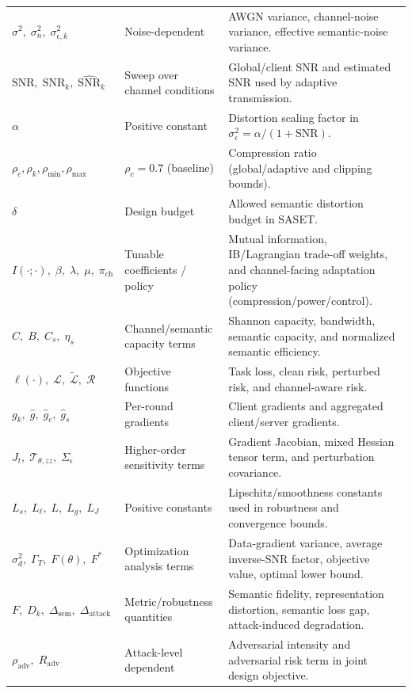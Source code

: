 \documentclass[10pt,journal]{IEEEtran}
\begin{document}
\begin{table}[htbp]
\begin{tabular}{p{}p{}p{}}
$\sigma^2,\;\sigma_n^2,\;\sigma_{\epsilon,k}^2$ & Noise-dependent & AWGN variance, channel-noise variance, effective semantic-noise variance. \\
$\mathrm{SNR},\;\mathrm{SNR}_k,\;\widehat{\mathrm{SNR}}_k$ & Sweep over channel conditions & Global/client SNR and estimated SNR used by adaptive transmission. \\
$\alpha$ & Positive constant & Distortion scaling factor in $\sigma_\epsilon^2=\alpha/(1+\mathrm{SNR})$. \\
$\rho_c,\rho_k,\rho_{\min},\rho_{\max}$ & $\rho_c=0.7$ (baseline) & Compression ratio (global/adaptive and clipping bounds). \\
$\delta$ & Design budget & Allowed semantic distortion budget in SASET. \\
$I(\cdot;\cdot),\;\beta,\;\lambda,\;\mu,\;\pi_{\mathrm{ch}}$ & Tunable coefficients / policy & Mutual information, IB/Lagrangian trade-off weights, and channel-facing adaptation policy (compression/power/control). \\
$C,\;B,\;C_s,\;\eta_s$ & Channel/semantic capacity terms & Shannon capacity, bandwidth, semantic capacity, and normalized semantic efficiency. \\
$\ell(\cdot),\;\mathcal{L},\;\tilde{\mathcal{L}},\;\mathcal{R}$ & Objective functions & Task loss, clean risk, perturbed risk, and channel-aware risk. \\
$g_k,\;\hat{g},\;\hat{g}_c,\;\hat{g}_s$ & Per-round gradients & Client gradients and aggregated client/server gradients. \\
$J_t,\;\mathcal{T}_{\theta,zz},\;\Sigma_\epsilon$ & Higher-order sensitivity terms & Gradient Jacobian, mixed Hessian tensor term, and perturbation covariance. \\
$L_s,\;L_\ell,\;L,\;L_g,\;L_J$ & Positive constants & Lipschitz/smoothness constants used in robustness and convergence bounds. \\
$\sigma_d^2,\;\Gamma_T,\;F(\theta),\;F^*$ & Optimization analysis terms & Data-gradient variance, average inverse-SNR factor, objective value, optimal lower bound. \\
$F,\;D_k,\;\Delta_{\mathrm{sem}},\;\Delta_{\mathrm{attack}}$ & Metric/robustness quantities & Semantic fidelity, representation distortion, semantic loss gap, attack-induced degradation. \\
$\rho_{\mathrm{adv}},\;R_{\mathrm{adv}}$ & Attack-level dependent & Adversarial intensity and adversarial risk term in joint design objective. \\

\end{tabular}
\end{table}
\end{document}

